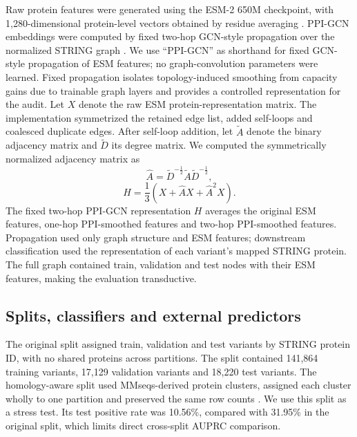 \documentclass[conference]{IEEEtran}
\begin{document}
Raw protein features were generated using the ESM-2 650M checkpoint, with 1,280-dimensional protein-level vectors obtained by residue averaging \cite{Lin2023ESM}. PPI-GCN embeddings were computed by fixed two-hop GCN-style propagation over the normalized STRING graph \cite{Kipf2017GCN}. We use ``PPI-GCN'' as shorthand for fixed GCN-style propagation of ESM features; no graph-convolution parameters were learned. Fixed propagation isolates topology-induced smoothing from capacity gains due to trainable graph layers and provides a controlled representation for the audit. Let $X$ denote the raw ESM protein-representation matrix. The implementation symmetrized the retained edge list, added self-loops and coalesced duplicate edges. After self-loop addition, let $\tilde{A}$ denote the binary adjacency matrix and $\tilde{D}$ its degree matrix. We computed the symmetrically normalized adjacency matrix as
\begin{equation}
\hat{A}=\tilde{D}^{-\frac{1}{2}}\tilde{A}\tilde{D}^{-\frac{1}{2}},
\end{equation}
\begin{equation}
H=\frac{1}{3}\left(X+\hat{A}X+\hat{A}^{2}X\right).
\end{equation}
The fixed two-hop PPI-GCN representation $H$ averages the original ESM features, one-hop PPI-smoothed features and two-hop PPI-smoothed features. Propagation used only graph structure and ESM features; downstream classification used the representation of each variant's mapped STRING protein. The full graph contained train, validation and test nodes with their ESM features, making the evaluation transductive.

\subsection{Splits, classifiers and external predictors}

The original split assigned train, validation and test variants by STRING protein ID, with no shared proteins across partitions. The split contained 141,864 training variants, 17,129 validation variants and 18,220 test variants. The homology-aware split used MMseqs-derived protein clusters, assigned each cluster wholly to one partition and preserved the same row counts \cite{Steinegger2017MMseqs2}. We use this split as a stress test. Its test positive rate was 10.56\%, compared with 31.95\% in the original split, which limits direct cross-split AUPRC comparison.
\end{document}
